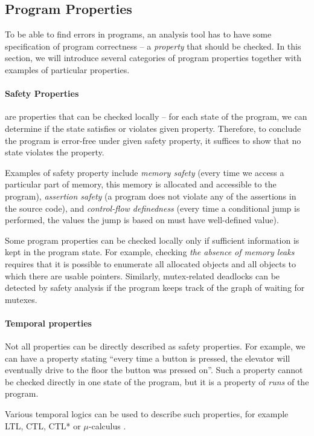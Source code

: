 \subsection{Program Properties}

To be able to find errors in programs, an analysis tool has to have
some specification of program correctness -- a \emph{property} that should be
checked.
In this section, we will introduce several categories of program properties
together with examples of particular properties.

\paragraph{Safety Properties}
%
are properties that can be checked locally -- for each state of the program, we
can determine if the state satisfies or violates given property.
Therefore, to conclude the program is error-free under given safety property, it suffices to show that no state violates the property.

Examples of safety property include \emph{memory safety} (every
time we access a particular part of memory, this memory is allocated and
accessible to the program), \emph{assertion safety} (a program
does not violate any of the assertions in the source code), and
\emph{control-flow definedness} (every time a conditional jump is
performed, the values the jump is based on must have well-defined value).

Some program properties can be checked locally only if sufficient information
is kept in the program state.
For example, checking \emph{the absence of memory leaks} requires that it is
possible to enumerate all allocated objects and all objects to which there are
usable pointers.
Similarly, mutex-related deadlocks can be detected by safety analysis if the program keeps track of the graph of waiting for mutexes.

\paragraph{Temporal properties}
%
Not all properties can be directly described as safety properties.
For example, we can have a property stating ``every time a button is pressed, the elevator will eventually drive to the floor the button was pressed on''.
Such a property cannot be checked directly in one state of the program, but it is a property of \emph{runs} of the program.

Various temporal logics can be used to describe such properties, for example
LTL, CTL, CTL*  or $\mu$-calculus .


